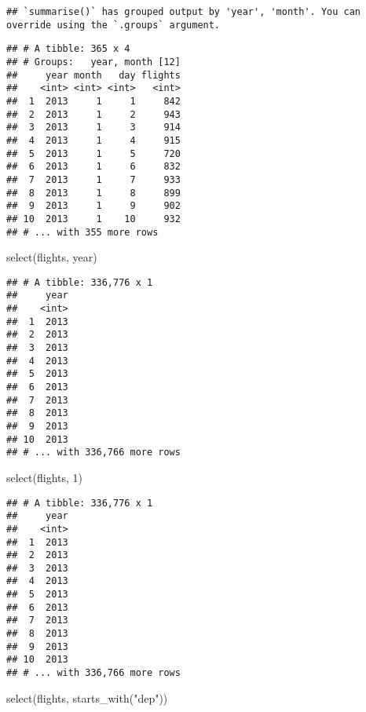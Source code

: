 \documentclass[
]{article}
\newenvironment{Shaded}{\begin{snugshade}}{\end{snugshade}}
\newcommand{\DecValTok}[1]{\textcolor[rgb]{0.00,0.00,0.81}{#1}}
\newcommand{\FunctionTok}[1]{\textcolor[rgb]{0.00,0.00,0.00}{#1}}
\newcommand{\NormalTok}[1]{#1}
\newcommand{\StringTok}[1]{\textcolor[rgb]{0.31,0.60,0.02}{#1}}
\begin{document}
\begin{verbatim}
## `summarise()` has grouped output by 'year', 'month'. You can override using the `.groups` argument.
\end{verbatim}

\begin{verbatim}
## # A tibble: 365 x 4
## # Groups:   year, month [12]
##     year month   day flights
##    <int> <int> <int>   <int>
##  1  2013     1     1     842
##  2  2013     1     2     943
##  3  2013     1     3     914
##  4  2013     1     4     915
##  5  2013     1     5     720
##  6  2013     1     6     832
##  7  2013     1     7     933
##  8  2013     1     8     899
##  9  2013     1     9     902
## 10  2013     1    10     932
## # ... with 355 more rows
\end{verbatim}

\begin{Shaded}
\begin{Highlighting}[]
\FunctionTok{select}\NormalTok{(flights, year)}
\end{Highlighting}
\end{Shaded}

\begin{verbatim}
## # A tibble: 336,776 x 1
##     year
##    <int>
##  1  2013
##  2  2013
##  3  2013
##  4  2013
##  5  2013
##  6  2013
##  7  2013
##  8  2013
##  9  2013
## 10  2013
## # ... with 336,766 more rows
\end{verbatim}

\begin{Shaded}
\begin{Highlighting}[]
\FunctionTok{select}\NormalTok{(flights, }\DecValTok{1}\NormalTok{)}
\end{Highlighting}
\end{Shaded}

\begin{verbatim}
## # A tibble: 336,776 x 1
##     year
##    <int>
##  1  2013
##  2  2013
##  3  2013
##  4  2013
##  5  2013
##  6  2013
##  7  2013
##  8  2013
##  9  2013
## 10  2013
## # ... with 336,766 more rows
\end{verbatim}

\begin{Shaded}
\begin{Highlighting}[]
\FunctionTok{select}\NormalTok{(flights, }\FunctionTok{starts\_with}\NormalTok{(}\StringTok{"dep"}\NormalTok{))}
\end{Highlighting}
\end{Shaded}
\end{document}
